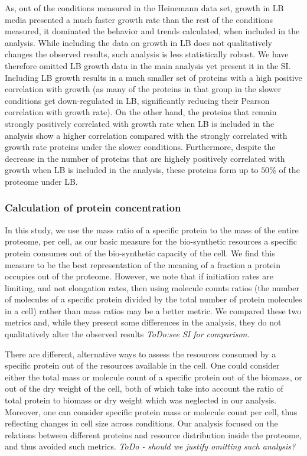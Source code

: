 \documentclass[notitlepage]{article}
\begin{document}
As, out of the conditions measured in the Heinemann data set, growth in LB media presented a much faster growth rate than the rest of the conditions measured, it dominated the behavior and trends calculated, when included in the analysis.
While including the data on growth in LB does not qualitatively changes the observed results, such analysis is less statistically robust.
We have therefore omitted LB growth data in the main analysis yet present it in the SI.
Including LB growth results in a much smaller set of proteins with a high positive correlation with growth (as many of the proteins in that group in the slower conditions get down-regulated in LB, significantly reducing their Pearson correlation with growth rate).
On the other hand, the proteins that remain strongly positively correlated with growth rate when LB is included in the analysis show a higher correlation compared with the strongly correlated with growth rate proteins under the slower conditions.
Furthermore, despite the decrease in the number of proteins that are highely positively correlated with growth when LB is included in the analysis, these proteins form up to $50\%$ of the proteome under LB.

\subsubsection{Calculation of protein concentration}
\label{protconc}
In this study, we use the mass ratio of a specific protein to the mass of the entire proteome, per cell, as our basic measure for the bio-synthetic resources a specific protein consumes out of the bio-synthetic capacity of the cell.
We find this measure to be the best representation of the meaning of a fraction a protein occupies out of the proteome.
However, we note that if initiation rates are limiting, and not elongation rates, then using molecule counts ratios (the number of molecules of a specific protein divided by the total number of protein molecules in a cell) rather than mass ratios may be a better metric.
We compared these two metrics and, while they present some differences in the analysis, they do not qualitatively alter the observed results \emph{ToDo:see SI for comparison}.

There are different, alternative ways to assess the resources consumed by a specific protein out of the resources available in the cell.
One could consider either the total mass or molecule count of a specific protein out of the biomass, or out of the dry weight of the cell, both of which take into account the ratio of total protein to biomass or dry weight which was neglected in our analysis.
Moreover, one can consider specific protein mass or molecule count per cell, thus reflecting changes in cell size across conditions.
Our analysis focused on the relations between different proteins and resource distribution inside the proteome, and thus avoided such metrics.
\emph{ToDo - should we justify omitting such analysis?}
\end{document}
